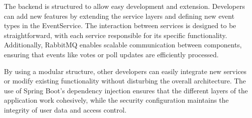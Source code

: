 The backend is structured to allow easy development and extension. Developers can add new features by extending the service layers and defining new event types in the EventService. The interaction between services is designed to be straightforward, with each service responsible for its specific functionality. Additionally, RabbitMQ enables scalable communication between components, ensuring that events like votes or poll updates are efficiently processed.

By using a modular structure, other developers can easily integrate new services or modify existing functionality without disturbing the overall architecture. The use of Spring Boot’s dependency injection ensures that the different layers of the application work cohesively, while the security configuration maintains the integrity of user data and access control.


